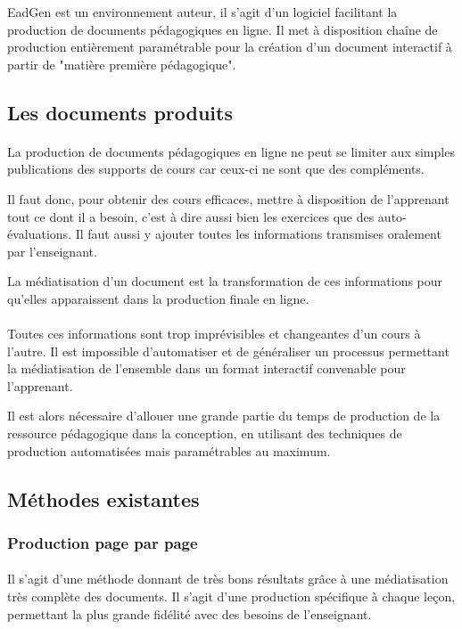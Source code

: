 EadGen est un environnement auteur, il s'agit d'un logiciel facilitant la production de documents pédagogiques en ligne. Il met à disposition chaîne de production entièrement paramétrable pour la création d'un document interactif à partir de "matière première pédagogique".

\subsection{Les documents produits}

\paragraph{}La production de documents pédagogiques en ligne ne peut se limiter aux simples publications des supports de cours car ceux-ci ne sont que des compléments. 

Il faut donc, pour obtenir des cours efficaces, mettre à disposition de l'apprenant tout ce dont il a besoin, c'est à dire aussi bien les exercices que des auto-évaluations. Il faut aussi y ajouter toutes les informations transmises oralement par l'enseignant. 

La médiatisation d'un document est la transformation de ces informations pour qu'elles apparaissent dans la production finale en ligne. 

\paragraph{}Toutes ces informations sont trop imprévisibles et changeantes d'un cours à l'autre. Il est impossible d'automatiser et de généraliser un processus permettant la médiatisation de l'ensemble dans un format interactif convenable pour l'apprenant. 

Il est alors nécessaire d’allouer une grande partie du temps de production de la ressource pédagogique dans la conception, en utilisant des techniques de production automatisées mais paramétrables au maximum.

\subsection{Méthodes existantes}
\subsubsection{Production page par page}
\paragraph{}Il s'agit d'une méthode donnant de très bons résultats grâce à une médiatisation très complète des documents. Il s'agit d'une production spécifique à chaque leçon, permettant la plus grande fidélité avec des besoins de l'enseignant. 

